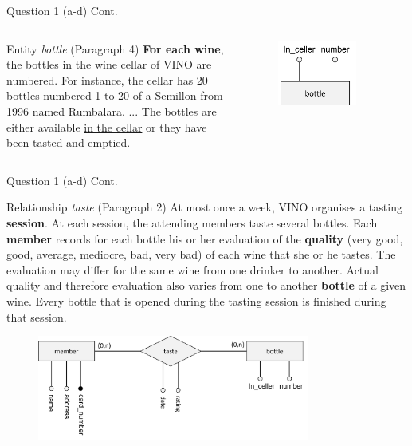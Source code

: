 \begin{frame}[fragile]{Question 1 (a-d) Cont.}
\begin{columns}
	\begin{exampleblock}{Entity \textit{bottle} (Paragraph 4)}
		\textbf{For each wine}, the bottles in the wine cellar of VINO are numbered. For instance, the cellar has 20 bottles \underline{numbered} 1 to 20 of a Semillon from 1996 named Rumbalara. ... The bottles are either available \underline{in the cellar} or they have been tasted and emptied.
	\end{exampleblock}
	\begin{figure}
		\includegraphics[width=0.8\textwidth, trim=0 0 0 0, clip]{t4/images/bottle_entity.png}
	\end{figure}
\end{columns}
\end{frame}

\begin{frame}[fragile]{Question 1 (a-d) Cont.}
\begin{exampleblock}{Relationship \textit{taste} (Paragraph 2)}
	At most once a week, VINO organises a tasting \textbf{session}. At each session, the attending members taste several	bottles. Each \textbf{member} records for each bottle his or her evaluation of the \textbf{quality} (very good, good, average, mediocre, bad, very bad) of each wine that she or he tastes. The evaluation may differ for the same wine from one drinker to another. Actual quality and therefore evaluation also varies from one to another \textbf{bottle} of a given wine. Every bottle that is opened during the tasting session is finished during that session.
\end{exampleblock}

\begin{figure}
	\includegraphics[width=0.8\textwidth]{t4/images/taste_relationship.png}
\end{figure}
\end{frame}

